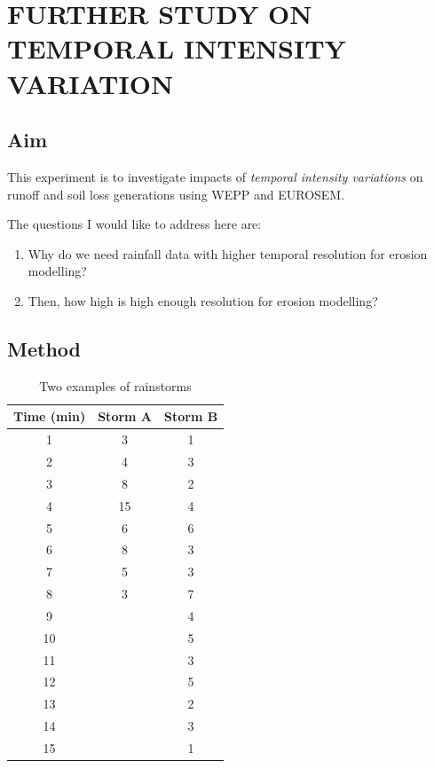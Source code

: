 \chapter{FURTHER STUDY ON TEMPORAL INTENSITY VARIATION}
\label{chap:bp2bpvariationchapter}

\section{Aim}
\label{sec:Aim}
This experiment is to investigate impacts of \emph{temporal intensity
variations} on runoff and soil loss generations using WEPP and EUROSEM.

The questions I would like to address here are:
\begin{enumerate}
  \item Why do we need rainfall data with higher temporal resolution for erosion
modelling?
  \item Then, how high is high enough resolution for erosion modelling?
\end{enumerate}

\section{Method}
\label{sec:Method}

\begin{table}[htbp]
  \centering
  \small
  \caption{Two examples of rainstorms}
  \label{tab:TwoExamplesofRainstorm}
    \begin{tabular}{ccc}
    \toprule
     Time (min) & Storm A & Storm B \\
    \midrule
    1 & 3 & 1 \\
    2 & 4 & 3 \\
    3 & 8 & 2 \\
    4 & 15 & 4 \\
    5 & 6 & 6 \\
    6 & 8 & 3 \\
    7 & 5 & 3 \\
    8 & 3 & 7 \\
    9 &  & 4 \\
    10&  & 5 \\
    11&  & 3 \\
    12&  & 5 \\
    13&  & 2 \\
    14&  & 3 \\
    15&  & 1 \\
    \bottomrule
    \end{tabular}
\end{table}

